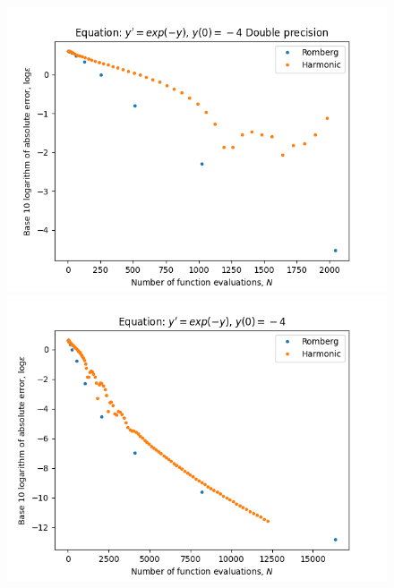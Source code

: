 \begin{figure}[H]
\centering
\begin{minipage}{0.45\textwidth}
\centering
\includegraphics[scale=0.45]{../results/emr_plots/ln_em4.png}
\end{minipage}
\begin{minipage}{0.45\textwidth}
\centering
\includegraphics[scale=0.45]{../results/emr_plots/ln_em4_hp.png}
\end{minipage}
\end{figure}

